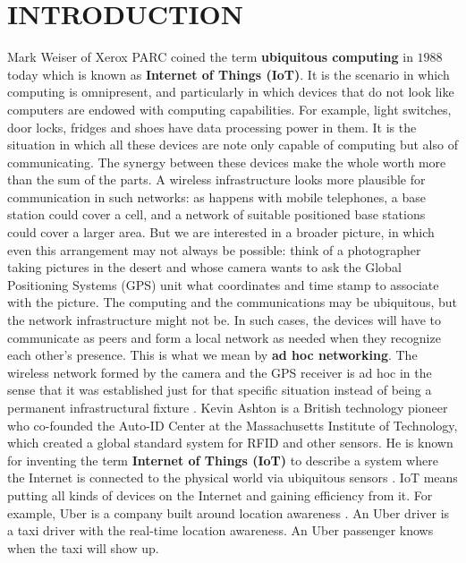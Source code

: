 \chapter{INTRODUCTION} %
\label{cha:introduction}
	
	Mark Weiser of Xerox PARC \cite{weiser1991computer} coined the term \textbf{ubiquitous computing} in $1988$ today which is known as \textbf{Internet of Things (IoT)}. 
	It is the scenario in which computing is omnipresent, and particularly in which devices that do not look like computers are endowed with computing capabilities.
	For example, light switches, door locks, fridges and shoes have data processing power in them.
	It is the situation in which all these devices are note only capable of computing but also of communicating.
	The synergy between these devices make the whole worth more than the sum of the parts.
	A wireless infrastructure looks more plausible for communication in such networks: as happens with mobile telephones, a base station could cover a cell, and a network of suitable positioned base stations could cover a larger area.
	But we are interested in a broader picture, in which even this arrangement may not always be possible: think of a photographer taking pictures in the desert and whose camera wants to ask the Global Positioning Systems (GPS) unit what coordinates and time stamp to associate with the picture.
	The computing and the communications may be ubiquitous, but the network infrastructure might not be.
	In such cases, the devices will have to communicate as peers and form a local network as needed when they recognize each other's presence.
	This is what we mean by \textbf{ad hoc networking}.
	The wireless network formed by the camera and the GPS receiver is ad hoc in the sense that it was established just for that specific situation instead of being a permanent infrastructural fixture \cite{2002-Stajano-ubiquitous}.
	Kevin Ashton is a British technology pioneer who co-founded the Auto-ID Center at the Massachusetts Institute of Technology, which created a global standard system for RFID and other sensors.
	He is known for inventing the term \textbf{Internet of Things (IoT)} to describe a system where the Internet is connected to the physical world via ubiquitous sensors \cite{ashton2009internet}.
	IoT means putting all kinds of devices on the Internet and gaining efficiency from it. 
	For example, Uber is a company built around location awareness \cite{Uber}.
	An Uber driver is a taxi driver with the real-time location awareness.
	An Uber passenger knows when the taxi will show up.

